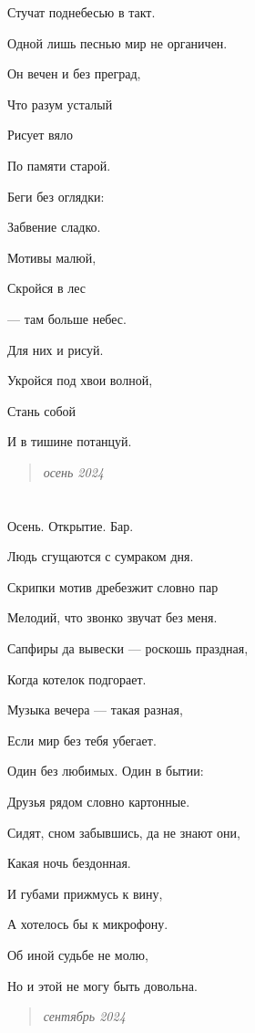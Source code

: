 \documentclass[
  a5paperpaper,
  DIV=11,
  numbers=noendperiod]{scrreprt}
\begin{document}
Стучат поднебесью в такт.

Одной лишь песнью мир не органичен.

Он вечен и без преград,

Что разум усталый

Рисует вяло

По памяти старой.

Беги без оглядки:

Забвение сладко.

Мотивы малюй,

Скройся в лес

--- там больше небес.

Для них и рисуй.

Укройся под хвои волной,

Стань собой

И в тишине потанцуй.

\begin{quote}
\emph{осень 2024}
\end{quote}

\section{}\label{section-20}

Осень. Открытие. Бар.

Людь сгущаются с сумраком дня.

Скрипки мотив дребезжит словно пар

Мелодий, что звонко звучат без меня.

Сапфиры да вывески --- роскошь праздная,

Когда котелок подгорает.

Музыка вечера --- такая разная,

Если мир без тебя убегает.

Один без любимых. Один в бытии:

Друзья рядом словно картонные.

Сидят, сном забывшись, да не знают они,

Какая ночь бездонная.

И губами прижмусь к вину,

А хотелось бы к микрофону.

Об иной судьбе не молю,

Но и этой не могу быть довольна.

\begin{quote}
\emph{сентябрь 2024}
\end{quote}
\end{document}
